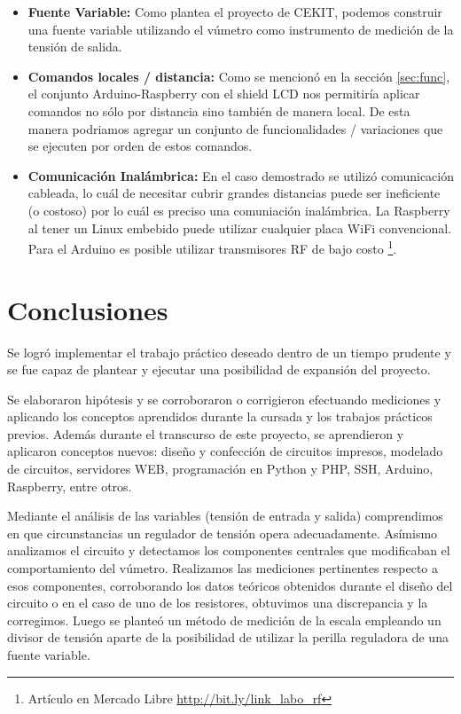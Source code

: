\documentclass[12pt,a4paper]{article}
\begin{document}
			\begin{itemize}
				\item \textbf{Fuente Variable:} Como plantea el proyecto de CEKIT, podemos construir una fuente variable utilizando el vúmetro como instrumento de medición de la tensión de salida.
				\item \textbf{Comandos locales / distancia:} Como se mencionó en la sección \ref{sec:func}, el conjunto Arduino-Raspberry con el shield LCD nos permitiría aplicar comandos no sólo por distancia sino también de manera local. De esta manera podriamos agregar un conjunto de funcionalidades / variaciones que se ejecuten por orden de estos comandos.
				\item \textbf{Comunicación Inalámbrica:} En el caso demostrado se utilizó comunicación cableada, lo cuál de necesitar cubrir grandes distancias puede ser ineficiente (o costoso) por lo cuál es preciso una comuniación inalámbrica. La Raspberry al tener un Linux embebido puede utilizar cualquier placa WiFi convencional. Para el Arduino es posible utilizar transmisores RF de bajo costo \footnote{Artículo en Mercado Libre \url{http://bit.ly/link_labo_rf}}.
			\end{itemize}


	\newpage\null\thispagestyle{empty}\newpage
	\section{Conclusiones}

	Se logró implementar el trabajo práctico deseado dentro de un tiempo prudente y se fue capaz de plantear y ejecutar una posibilidad de expansión del proyecto.

	Se elaboraron hipótesis y se corroboraron o corrigieron efectuando mediciones y aplicando los conceptos aprendidos durante la cursada y los trabajos prácticos previos. Además durante el transcurso de este proyecto, se aprendieron y aplicaron conceptos nuevos: diseño y confección de circuitos impresos, modelado de circuitos, servidores WEB, programación en Python y PHP, SSH, Arduino, Raspberry, entre otros. 

	Mediante el análisis de las variables (tensión de entrada y salida) comprendimos en que circunstancias un regulador de tensión opera adecuadamente. Asímismo analizamos el circuito y detectamos los componentes centrales que modificaban el comportamiento del vúmetro. Realizamos las mediciones pertinentes respecto a esos componentes, corroborando los datos teóricos obtenidos durante el diseño del circuito o en el caso de uno de los resistores, obtuvimos una discrepancia y la corregimos. Luego se planteó un método de medición de la escala empleando un divisor de tensión aparte de la posibilidad de utilizar la perilla reguladora de una fuente variable. 
\end{document}
